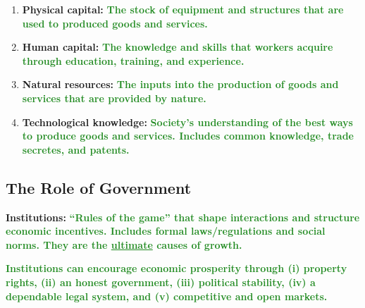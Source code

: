 \documentclass[11pt]{article}\usepackage[]{graphicx}\usepackage[]{color}
\theoremstyle{definition}
\newcommand{\blank}[1]{}
\newcommand{\ddp}[1]{{\textbf{\textcolor{ForestGreen}{#1}}}}
\newcommand{\defn}[1]{\textbf{#1}}
\begin{document}
\begin{enumerate}
	\item \defn{Physical capital:} \ddp{The stock of equipment and structures that are used to produced goods and services.}
	\blank{}
	\blank{}
	\item \defn{Human capital:} \ddp{The knowledge and skills that workers acquire through education, training, and experience.}
	\blank{}
	\blank{}
	\item \defn{Natural resources:} \ddp{The inputs into the production of goods and services that are provided by nature.}
	\blank{}
	\blank{}
	\item \defn{Technological knowledge:} \ddp{Society's understanding of the best ways to produce goods and services. Includes common knowledge, trade secretes, and patents.}
	\blank{}
	\blank{}
\end{enumerate}

\subsection{The Role of Government}

\defn{Institutions:} \ddp{``Rules of the game'' that shape interactions and structure economic incentives. Includes formal laws/regulations and social norms. They are the \underline{ultimate} causes of growth.\\}


\ddp{Institutions can encourage economic prosperity through (i) property rights, (ii) an honest government, (iii) political stability, (iv) a dependable legal system, and (v) competitive and open markets.}
\end{document}
